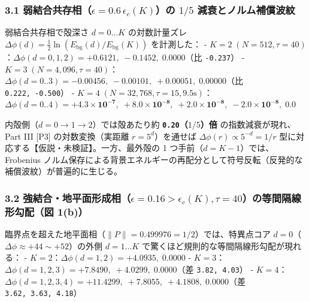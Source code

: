 \documentclass[
  a4paper,
]{ltjsarticle}
\begin{document}
\subsubsection{\texorpdfstring{3.1
弱結合共存相（\(\epsilon = 0.6\,\epsilon_c(K)\)）の \(1/5\)
減衰とノルム補償波紋}{3.1 弱結合共存相（\textbackslash epsilon = 0.6\textbackslash,\textbackslash epsilon\_c(K)）の 1/5 減衰とノルム補償波紋}}\label{ux5f31ux7d50ux5408ux5171ux5b58ux76f8epsilon-0.6epsilon_ckux306e-15-ux6e1bux8870ux3068ux30ceux30ebux30e0ux88dcux511fux6ce2ux7d0b}

弱結合共存相で殻深さ \(d = 0 \dots K\) の対数計量ズレ
\(\Delta\phi(d) = \frac{1}{2}\ln(E_{\mathrm{bg}}(d)/E_{\mathrm{bg}}(K))\)
を計測した： -
\textbf{\(K = 2\;(N=512, \tau=40)\)}：\(\Delta\phi(d=0,1,2) = \mathbf{+0.6121,\; -0.1452,\; 0.0000}\)（比
\texttt{-0.237}） -
\textbf{\(K = 3\;(N=4{,}096, \tau=40)\)}：\(\Delta\phi(d=0..3) = \mathbf{-0.00456,\; -0.00101,\; +0.00051,\; 0.00000}\)（比
\texttt{0.222,\ -0.500}） -
\textbf{\(K = 4\;(N=32{,}768, \tau=15, 9.5\text{s})\)}：\(\Delta\phi(d=0..4) = \mathbf{+4.3\times 10^{-7},\; +8.0\times 10^{-8},\; +2.0\times 10^{-8},\; -2.0\times 10^{-8},\; 0.0}\)

内殻側（\(d = 0 \to 1 \to 2\)）では殻あたり約
\textbf{\texttt{0.20}（\(1/5\)）倍} の指数減衰が現れ、Part III {[}P3{]}
の対数変換（実距離 \(r = 5^d\)）を通せば
\(\Delta\phi(r) \propto 5^{-d} = 1/r\)
型に対応する【仮説・未検証】。一方、最外殻の 1
つ手前（\(d=K-1\)）では、Frobenius
ノルム保存による背景エネルギーの再配分として符号反転（反発的な補償波紋）が普遍的に生じる。

\subsubsection{\texorpdfstring{3.2
強結合・地平面形成相（\(\epsilon = 0.16 > \epsilon_c(K), \tau=40\)）の等間隔線形勾配（図
1(b)）}{3.2 強結合・地平面形成相（\textbackslash epsilon = 0.16 \textgreater{} \textbackslash epsilon\_c(K), \textbackslash tau=40）の等間隔線形勾配（図 1(b)）}}\label{ux5f37ux7d50ux5408ux5730ux5e73ux9762ux5f62ux6210ux76f8epsilon-0.16-epsilon_ck-tau40ux306eux7b49ux9593ux9694ux7ddaux5f62ux52feux914dux56f3-1b}

臨界点を超えた地平面相（\(\|P\| = 0.499976 = 1/2\)）では、特異点コア
\(d=0\)（\(\Delta\phi \approx +44 \sim +52\)）の外側 \(d = 1 \dots K\)
で驚くほど規則的な等間隔線形勾配が現れる： -
\textbf{\(K = 2\)}：\(\Delta\phi(d=1, 2) = \mathbf{+4.0935,\; 0.0000}\)
-
\textbf{\(K = 3\)}：\(\Delta\phi(d=1, 2, 3) = \mathbf{+7.8490,\; +4.0299,\; 0.0000}\)（差
\texttt{3.82,\ 4.03}） -
\textbf{\(K = 4\)}：\(\Delta\phi(d=1, 2, 3, 4) = \mathbf{+11.4299,\; +7.8055,\; +4.1808,\; 0.0000}\)（差
\texttt{3.62,\ 3.63,\ 4.18}）
\end{document}
